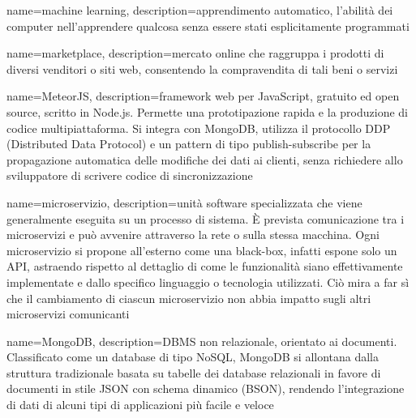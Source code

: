 

{
	name=machine learning,
	description={apprendimento automatico, l'abilità dei computer nell'apprendere qualcosa senza essere stati esplicitamente programmati}
}	

{
	name=marketplace,
	description={mercato online che raggruppa i prodotti di diversi venditori o siti web, consentendo la compravendita di tali beni o servizi}
}

{
	name=MeteorJS,
	description={framework web per JavaScript, gratuito ed open source, scritto in Node.js. Permette una prototipazione rapida e la produzione di codice multipiattaforma. Si integra con MongoDB, utilizza il protocollo DDP (Distributed Data Protocol) e un pattern di tipo publish-subscribe per la propagazione automatica delle modifiche dei dati ai clienti, senza richiedere allo sviluppatore di scrivere codice di sincronizzazione}
}		

{
	name=microservizio,
	description={unità software specializzata che viene generalmente eseguita su un processo di sistema. \MakeUppercase{è} prevista comunicazione tra i microservizi e può avvenire attraverso la rete o sulla stessa macchina. Ogni microservizio si propone all’esterno come una black-box, infatti espone solo un API, astraendo rispetto al dettaglio di come le funzionalità siano effettivamente implementate e dallo specifico linguaggio o tecnologia utilizzati. Ciò mira a far sì che il cambiamento di ciascun microservizio non abbia impatto sugli altri microservizi comunicanti}
}		

{
	name=MongoDB,
	description={DBMS non relazionale, orientato ai documenti. Classificato come un database di tipo NoSQL, MongoDB si allontana dalla struttura tradizionale basata su tabelle dei database relazionali in favore di documenti in stile JSON con schema dinamico (BSON), rendendo l'integrazione di dati di alcuni tipi di applicazioni più facile e veloce}
}	

